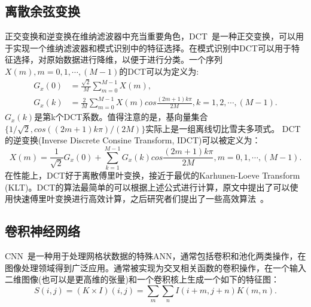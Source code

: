 \subsection{离散余弦变换}
\label{sec:dct}
正交变换和逆变换在维纳滤波器中充当重要角色，DCT~\cite{ahmed1974discrete}是一种正交变换，可以用于实现一个维纳滤波器和模式识别中的特征选择。在模式识别中DCT可以用于特征选择，对原始数据进行降维，以便于进行分类。一个序列$X(m),m=0,1,\cdots,(M-1)$的DCT可以为定义为:
\begin{equation}
\label{equ:dct}
\begin{aligned}
G_{x}\left( 0\right) &= \frac{\sqrt{2}}{M} \sum_{m=0}^{M-1}X\left( m\right), \\
G_{x}\left( k\right) &= \frac{2}{M} \sum_{m=0}^{M-1}X\left( m\right)cos\frac{\left(2m+1\right)k\pi}{2M}, k=1,2,\cdots,(M-1).
\end{aligned}
\end{equation}
$G_{x}(k)$是第k个DCT系数。值得注意的是，基向量集合$\{ 1/\sqrt{2}, cos((2m+1)k\pi)/(2M) \}$实际上是一组离线切比雪夫多项式。
DCT的逆变换(Inverse Discrete Consine Transform, IDCT)可以被定义为：
\begin{equation}
\label{equ:idct}
X(m) = \frac{1}{\sqrt{2}}G_{x}(0) + \sum_{k=1}^{M-1}G_{x}(k)cos\frac{(2m+1)k\pi}{2M}, m=0,1,\cdots,(M-1). 
\end{equation}
在性能上，DCT好于离散傅里叶变换，接近于最优的Karhunen-Loeve Transform (KLT)。DCT的算法最简单的可以根据上述公式进行计算，原文\cite{ahmed1974discrete}中提出了可以使用快速傅里叶变换进行高效计算，之后研究者们提出了一些高效算法~\cite{winograd1978computing,lee1984new,hou1987fast}。

\subsection{卷积神经网络}
CNN~\cite{goodfellow2016deep}是一种用于处理网格状数据的特殊ANN，通常包括卷积和池化两类操作，在图像处理领域得到广泛应用。通常被实现为交叉相关函数的卷积操作，在一个输入二维图像(也可以是更高维的张量)和一个卷积核上生成一个如下的特征图：
\begin{equation}
 S(i,j)=(K\times I)(i,j)=\sum_{m}\sum_{n}I(i+m,j+n)K(m,n).
\end{equation}


